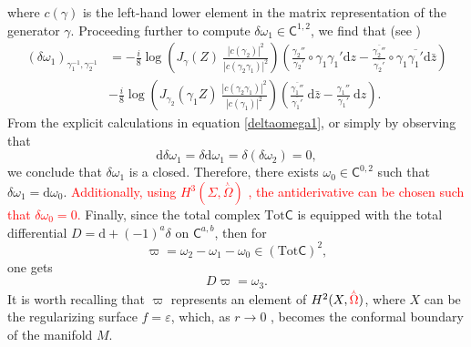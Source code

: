 \documentclass[a4paper,11pt]{article}
\newcommand{\dd}{\mathrm{d}}
\newcommand{\singrigon}{\overset{{}_{\curlywedge}}{\Omega}}
\newcommand{\compfont}[1]{\bm{\mathsf{#1}}}
\begin{document}
where $c(\gamma)$ is the left-hand lower element in the matrix representation of the generator $\gamma$. Proceeding further to compute  $\delta\omega_1\in \compfont{C}^{1,2}$, we find that (see  \cite{Takhtajan_2003})
\begin{equation}
\begin{split}
\left(\delta\omega_1\right)_{\gamma_1^{-1},\gamma_{2}^{-1}} &= -\frac{i}{8}\log\left(J_{\gamma}(Z)~\frac{\left|c(\gamma_2)\right|^2}{\left|c(\gamma_2\gamma_1)\right|^2}\right)\left(\frac{\gamma_2''}{\gamma_2'}\circ\gamma_1\gamma_1' \dd z -\frac{\overline{\gamma_2''}}{\overline{\gamma_2'}} \circ\gamma_1\overline{\gamma_1'} \dd \bar{z}\right)\\&-\frac{i}{8}\log\left(J_{\gamma_2}(\gamma_1 Z)~\frac{\left|c(\gamma_2\gamma_1)\right|^2}{\left|c(\gamma_1)\right|^2}\right)\left(\frac{\overline{\gamma_1''}}{\overline{\gamma_1'}}~\dd \bar{z}-\frac{\gamma_1''}{\gamma_1'}~\dd z\right).\label{deltaomega1}
\end{split}
\end{equation}
From the explicit calculations in equation \eqref{deltaomega1}, or simply by observing that
\begin{equation}
\dd \delta\omega_1 = \delta\dd\omega_1=\delta(\delta\omega_2)=0,
\end{equation}
we conclude that $\delta\omega_1$ is a closed. Therefore, there exists $\omega_0\in \compfont{C}^{0,2}$ such that $\delta\omega_1=\dd \omega_0$. \textcolor{red}{Additionally, using $H^{3}(\Sigma,\singrigon)$ , the antiderivative can be chosen such that $\delta\omega_0=0$.} Finally, since the total complex $\text{Tot} \compfont{C}$ is equipped with the total differential $D= \dd+(-1)^a \delta$ on $\compfont{C}^{a,b}$, then for \begin{equation}
\varpi= \omega_2-\omega_1-\omega_0\in (\text{Tot}\compfont{C})^2,\label{varpi}
\end{equation}
one gets
\begin{equation}
D\varpi = \omega_3.\label{Dvarpi}
\end{equation}
It is worth recalling that $\varpi$ represents an element of $H^{2}(X,\textcolor{red}{\singrigon})$, where $X$ can be the regularizing surface $f=\varepsilon$, which, as $r\rightarrow 0$ , becomes the conformal boundary of the manifold $M$.





\end{document}
